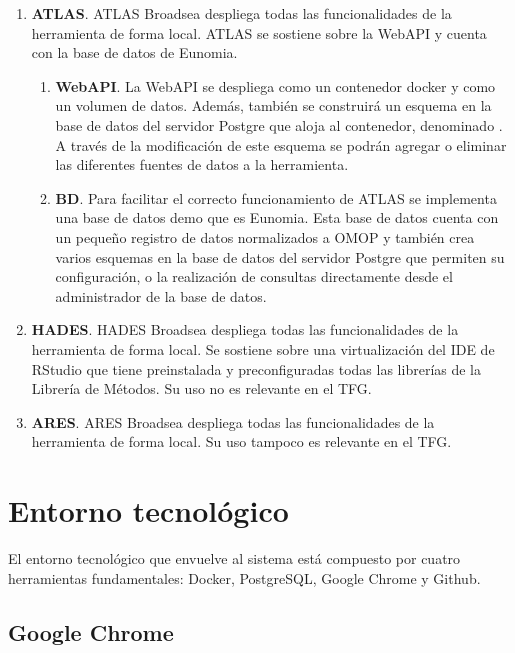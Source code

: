 \begin{enumerate}

    \item \textbf{ATLAS}. ATLAS Broadsea despliega todas las funcionalidades de la herramienta de forma local. ATLAS se sostiene sobre la WebAPI y cuenta con la base de datos de Eunomia.
    
    \begin{enumerate}
        \item \textbf{WebAPI}. La WebAPI se despliega como un contenedor docker y como un volumen de datos. Además, también se construirá un esquema en la base de datos del servidor Postgre que aloja al contenedor, denominado . A través de la modificación de este esquema se podrán agregar o eliminar las diferentes fuentes de datos a la herramienta.
        \item \textbf{BD}. Para facilitar el correcto funcionamiento de ATLAS se implementa una base de datos demo que es Eunomia. Esta base de datos cuenta con un pequeño registro de datos normalizados a OMOP y también crea varios esquemas en la base de datos del servidor Postgre que permiten su configuración, o la realización de consultas directamente desde el administrador de la base de datos.
    \end{enumerate}

    \item \textbf{HADES}. HADES Broadsea despliega todas las funcionalidades de la herramienta de forma local. Se sostiene sobre una virtualización del IDE de RStudio que tiene preinstalada y preconfiguradas todas las librerías de la Librería de Métodos. Su uso no es relevante en el TFG.
   
    \item \textbf{ARES}. ARES Broadsea despliega todas las funcionalidades de la herramienta de forma local. Su uso tampoco es relevante en el TFG.

\end{enumerate}



\section{Entorno tecnológico} \label{sec:07entorno}

El entorno tecnológico que envuelve al sistema está compuesto por cuatro herramientas fundamentales: Docker, PostgreSQL, Google Chrome y Github.


\subsection{Google Chrome}

